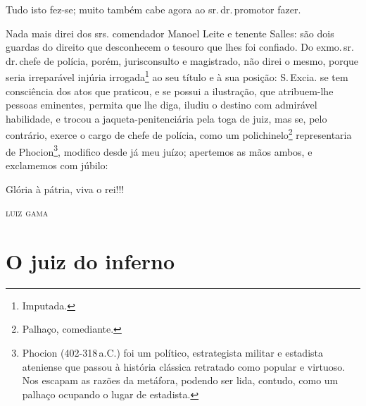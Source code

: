 Tudo isto fez-se; muito também cabe agora ao sr.\,dr.\,promotor fazer.

Nada mais direi dos srs. comendador Manoel Leite e tenente Salles: são
dois guardas do direito que desconhecem o tesouro que lhes foi confiado.
Do exmo.\,sr.\,dr.\,chefe de polícia, porém, jurisconsulto e magistrado,
não direi o mesmo, porque seria irreparável injúria irrogada\footnote{
  Imputada.} ao seu título e à sua posição: S.\,Excia. se tem consciência
dos atos que praticou, e se possui a ilustração, que atribuem-lhe
pessoas eminentes, permita que lhe diga, iludiu o destino com admirável
habilidade, e trocou a jaqueta-penitenciária pela toga de juiz, mas se,
pelo contrário, exerce o cargo de chefe de polícia, como um
polichinelo\footnote{ Palhaço, comediante.} representaria de
Phocion\footnote{ Phocion (402-318\,a.C.) foi um político,
  estrategista militar e estadista ateniense que passou à história
  clássica retratado como popular e virtuoso. Nos escapam as razões da
  metáfora, podendo ser lida, contudo, como um palhaço ocupando o lugar
  de estadista.}, modifico desde já meu juízo; apertemos as mãos ambos,
e exclamemos com júbilo:

Glória à pátria, viva o rei!!!

\begin{flushright}
\textsc{luiz gama}
\end{flushright}


\part{O juiz do inferno}

